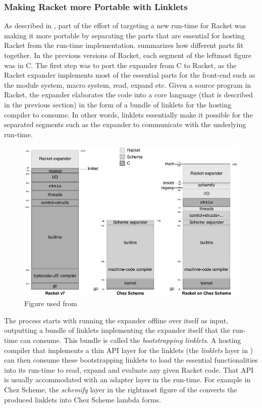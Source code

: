 \newpage

\subsubsection{Making Racket more Portable with Linklets}

As described in , part of the effort of targeting a
new run-time for Racket was making it more portable by separating the
parts that are essential for hosting Racket from the run-time
implementation.  summarizes how different
parts fit together. In the previous versions of Racket, each segment
of the leftmost figure was in C. The first step was to port the
expander from C to Racket, as the Racket expander implements most of
the essential parts for the front-end such as the module system, macro
system, read, expand etc. Given a source program in Racket, the
expander elaborates the code into a core language (that is described
in the previous section) in the form of a bundle of linklets for the
hosting compiler to consume. In other words, linklets essentially make
it possible for the separated segments such as the expander to
communicate with the underlying run-time.

\begin{figure}[h]
  \centering
  \includegraphics[scale=0.3]{img/racket-portable}
  \caption{Figure used from \cite{racket-on-chez-19}}
  \label{fig:racket-portable}
\end{figure}

The process starts with running the expander offline over itself as
input, outputting a bundle of linklets implementing the expander
itself that the run-time can consume. This bundle is called the
\emph{bootstrapping linklets}. A hosting compiler that implements a
thin API layer for the linklets (the \emph{linklets} layer in
) can then consume these bootstrapping
linklets to load the essential functionalities into its run-time to
read, expand and evaluate any given Racket code. That API is usually
accommodated with an adapter layer in the run-time. For example in
Chez Scheme, the \emph{schemify} layer in the rightmost figure of the
 converts the produced linklets into Chez
Scheme lambda forms.

